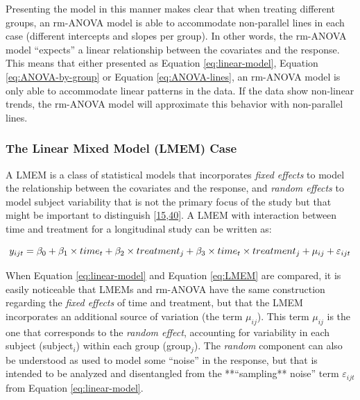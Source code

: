 \documentclass[
]{article}
\begin{document}
Presenting the model in this manner makes clear that when treating different groups, an rm-ANOVA model is able to accommodate non-parallel lines in each case (different intercepts and slopes per group). In other words, the rm-ANOVA model ``expects'' a linear relationship between the covariates and the response. This means that either presented as Equation \eqref{eq:linear-model}, Equation \eqref{eq:ANOVA-by-group} or Equation \eqref{eq:ANOVA-lines}, an rm-ANOVA model is only able to accommodate linear patterns in the data. If the data show non-linear trends, the rm-ANOVA model will approximate this behavior with non-parallel lines.

\hypertarget{LMEM-case}{%
\subsubsection{The Linear Mixed Model (LMEM) Case}\label{LMEM-case}}

A LMEM is a class of statistical models that incorporates \emph{fixed effects} to model the relationship between the covariates and the response, and \emph{random effects} to model subject variability that is not the primary focus of the study but that might be important to distinguish {[}\protect\hyperlink{ref-pinheiro2006}{15},\protect\hyperlink{ref-west2014}{40}{]}. A LMEM with interaction between time and treatment for a longitudinal study can be written as:

\begin{equation}
y_{ijt} = \beta_0+ \beta_1 \times time_{t} + \beta_2 \times treatment_{j} + \beta_3 \times time_{t}\times treatment_{j}+\mu_{ij} +\varepsilon_{ijt}\\ 
\label{eq:LMEM}
\end{equation}

When Equation \eqref{eq:linear-model} and Equation \eqref{eq:LMEM} are compared, it is easily noticeable that LMEMs and rm-ANOVA have the same construction regarding the \emph{fixed effects} of time and treatment, but that the LMEM incorporates an additional source of variation (the term \(\mu_{ij}\)). This term \(\mu_{ij}\) is the one that corresponds to the \emph{random effect}, accounting for variability in each subject (subject\(_i\)) within each group (group\(_j\)). The \emph{random} component can also be understood as used to model some ``noise'' in the response, but that is intended to be analyzed and disentangled from the **``sampling** noise'' term \(\varepsilon_{ijt}\) from Equation \eqref{eq:linear-model}.
\end{document}
